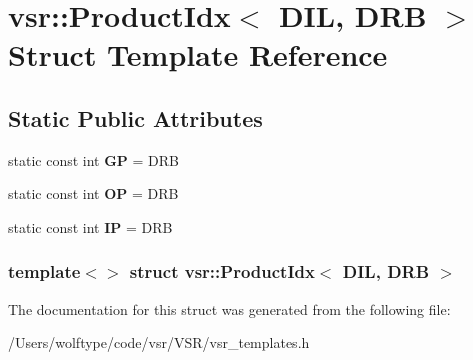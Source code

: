 \hypertarget{structvsr_1_1_product_idx_3_01_d_i_l_00_01_d_r_b_01_4}{\section{vsr\-:\-:Product\-Idx$<$ D\-I\-L, D\-R\-B $>$ Struct Template Reference}
\label{structvsr_1_1_product_idx_3_01_d_i_l_00_01_d_r_b_01_4}
}
\subsection*{Static Public Attributes}
\begin{DoxyCompactItemize}
\item 
\hypertarget{structvsr_1_1_product_idx_3_01_d_i_l_00_01_d_r_b_01_4_ae1a3b2b4789fb3f89ff11d4664d20a43}{static const int {\bfseries G\-P} = D\-R\-B}\label{structvsr_1_1_product_idx_3_01_d_i_l_00_01_d_r_b_01_4_ae1a3b2b4789fb3f89ff11d4664d20a43}

\item 
\hypertarget{structvsr_1_1_product_idx_3_01_d_i_l_00_01_d_r_b_01_4_ae7e1c535598527b90cd0f36977839fd4}{static const int {\bfseries O\-P} = D\-R\-B}\label{structvsr_1_1_product_idx_3_01_d_i_l_00_01_d_r_b_01_4_ae7e1c535598527b90cd0f36977839fd4}

\item 
\hypertarget{structvsr_1_1_product_idx_3_01_d_i_l_00_01_d_r_b_01_4_aa35566757cd8aa366324a876772165f6}{static const int {\bfseries I\-P} = D\-R\-B}\label{structvsr_1_1_product_idx_3_01_d_i_l_00_01_d_r_b_01_4_aa35566757cd8aa366324a876772165f6}

\end{DoxyCompactItemize}
\subsubsection*{template$<$$>$ struct vsr\-::\-Product\-Idx$<$ D\-I\-L, D\-R\-B $>$}



The documentation for this struct was generated from the following file\-:\begin{DoxyCompactItemize}
\item 
/\-Users/wolftype/code/vsr/\-V\-S\-R/vsr\-\_\-templates.\-h\end{DoxyCompactItemize}
